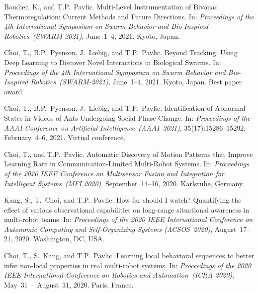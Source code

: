 \documentclass[10pt]{article}
\begin{document}
\begin{bibenum}
    \item Baudier, K., and T.P.~Pavlic.
        Multi-Level Instrumentation of Bivouac Thermoregulation: Current
        Methods and Future Directions.
        In: \emph{Proceedings of the 4th International Symposium on
            Swarm Behavior and Bio-Inspired Robotics~(SWARM-2021)},
            June~1--4, 2021. Kyoto, Japan.

    \item Choi, T., B.P.~Pyenson, J.~Liebig, and T.P.~Pavlic.
        Beyond Tracking: Using Deep Learning to Discover Novel
        Interactions in Biological Swarms.
        In: \emph{Proceedings of the 4th International Symposium on
            Swarm Behavior and Bio-Inspired Robotics~(SWARM-2021)},
            June~1--4, 2021. Kyoto, Japan. Best paper award.

    \item Choi, T., B.P.~Pyenson, J.~Liebig, and T.P.~Pavlic.
        Identification of Abnormal States in Videos of Ants Undergoing
        Social Phase Change.
        In: \emph{Proceedings of the AAAI Conference on Artificial
            Intelligence~(AAAI~2021)}, 35(17):15286--15292,
            February~4--6, 2021. Virtual conference.

    \item Choi, T., and T.P.~Pavlic.
        Automatic Discovery of Motion Patterns that Improve Learning
        Rate in Communication-Limited Multi-Robot Systems.
        In: \emph{Proceedings of the 2020 IEEE Conference on Multisensor
        Fusion and Integration for Intelligent Systems~(MFI 2020)},
        September~14--16, 2020. Karlsruhe, Germany.

    \item Kang, S., T.~Choi, and T.P.~Pavlic.
        How far should I watch? Quantifying the effect of various
        observational capabilities on long-range situational awareness
        in multi-robot teams.
        In: \emph{Proceedings of the 2020 IEEE International Conference
        on Autonomic Computing and Self-Organizing Systems
        (ACSOS~2020)}, August~17--21, 2020. Washington, DC, USA.

    \item Choi, T., S.~Kang, and T.P.~Pavlic.
        Learning local behavioral sequences to better infer non-local
        properties in real multi-robot systems.
        In: \emph{Proceedings of the 2020 IEEE International Conference
        on Robotics and Automation~(ICRA 2020)}, May~31~-- August~31,
        2020. Paris, France.


\end{bibenum}
\end{document}
